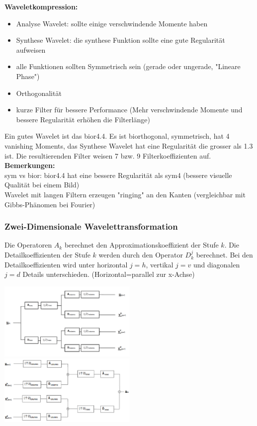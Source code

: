 \textbf{Waveletkompression:}
\begin{itemize}
	\item Analyse Wavelet: sollte einige verschwindende Momente haben
	\item Synthese Wavelet: die synthese Funktion sollte eine gute Regularität aufweisen
	\item alle Funktionen sollten Symmetrisch sein (gerade oder ungerade, "Lineare Phase")
	\item Orthogonalität
	\item kurze Filter für bessere Performance (Mehr verschwindende Momente und bessere Regularität erhöhen die Filterlänge)
\end{itemize}
Ein gutes Wavelet ist das bior4.4. Es ist biorthogonal, symmetrisch, hat 4 vanishing Moments, das Synthese Wavelet hat eine Regularität die grosser als 1.3 ist. Die resultierenden Filter weisen 7 bzw. 9 Filterkoeffizienten auf.\\

\textbf{Bemerkungen:}\\
sym vs bior: bior4.4 hat eine bessere Regularität als sym4 (bessere visuelle Qualität bei einem Bild)\\
Wavelet mit langen Filtern erzeugen "ringing" an den Kanten (vergleichbar mit Gibbs-Phänomen bei Fourier)\\


\subsubsection{Zwei-Dimensionale Wavelettransformation}

Die Operatoren $A_k$ berechnet den Approximationskoeffizient der Stufe $k$. Die Detailkoeffizienten der Stufe $k$ werden durch den Operator $D_k^j$ berechnet. Bei den Detailkoeffizienten wird unter horizontal $j=h$, vertikal $j=v$ und diagonalen $j=d$ Details unterschieden. (Horizontal=parallel zur x-Achse)

\includegraphics[width=0.5\textwidth]{content/Wavelet2DDec.pdf}	
\includegraphics[width=0.5\textwidth]{content/Wavelet2DRec.pdf}

